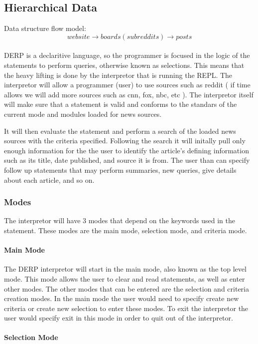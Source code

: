 \subsection{Hierarchical Data}
Data structure flow model: $$website \rightarrow boards (subreddits) \rightarrow posts$$\\
DERP is a declaritive language, so the programmer is focused in the logic of the statements to perform queries, otherwise known as selections. This means that the heavy lifting is done by the interpretor that is running the REPL. The interpretor will allow a programmer (user) to use sources such as reddit ( if time allows we will add more sources such as cnn, fox, nbc, etc ). The interpretor itself will make sure that a statement is valid and conforms to the standars of the current mode and modules loaded for news sources.

It will then evaluate the statement and perform a search of the loaded news sources with the criteria specified. Following the search it will initally pull only enough information for the the user to identify the article's defining information such as its title, date published, and source it is from. The user than can specify follow up statements that may perform summaries, new queries, give details about each article, and so on.


\subsubsection{Modes}
The interpretor will have 3 modes that depend on the keywords used in the statement. These modes are the main mode, selection mode, and criteria mode.

\paragraph{Main Mode}

The DERP interpretor will start in the main mode, also known as the top level mode. This mode allows the user to clear and read statements, as well as enter other modes. The other modes that can be entered are the selection and criteria creation modes. In the main mode the user would need to specify create new criteria or create new selection to enter these modes. To exit the interpretor the user would specify exit in this mode in order to quit out of the interpretor.

\paragraph{Selection Mode}

